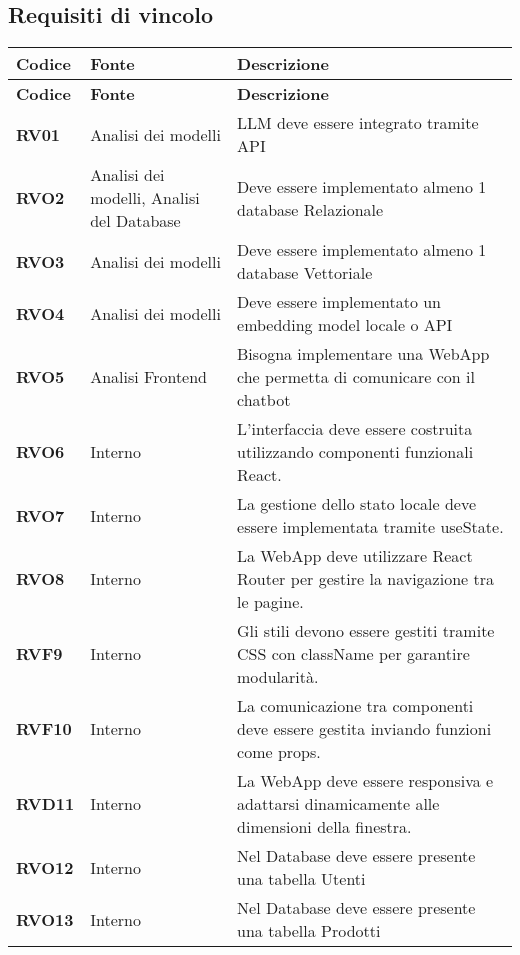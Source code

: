 \subsection{Requisiti di vincolo}
\begin{longtable}{|>{\centering\arraybackslash}m{}|>{\centering\arraybackslash}m{}|>{\centering\arraybackslash}m{}|}
	\hline
	\textbf{Codice} & \textbf{Fonte} & \textbf{Descrizione}\\\hline
	\endfirsthead
	\hline
	\textbf{Codice} & \textbf{Fonte} & \textbf{Descrizione}\\\hline
	\endhead
	\hline
	\textbf{RV01} & Analisi dei modelli    & LLM deve essere integrato tramite API\\
	\hline
	\textbf{RVO2} & Analisi dei modelli, Analisi del Database & Deve essere implementato almeno 1 database Relazionale\\
	\hline
	\textbf{RVO3} & Analisi dei modelli & Deve essere implementato almeno 1 database Vettoriale\\
	\hline
	\textbf{RVO4} & Analisi dei modelli & Deve essere implementato un embedding model locale o API\\
	\hline
	\textbf{RVO5} & Analisi Frontend & Bisogna implementare una WebApp che permetta di comunicare con il chatbot\\
	\hline
	\textbf{RVO6} & Interno & L’interfaccia deve essere costruita utilizzando componenti funzionali React.\\
	\hline
	\textbf{RVO7} & Interno & La gestione dello stato locale deve essere implementata tramite useState.\\
	\hline
	\textbf{RVO8} & Interno & La WebApp deve utilizzare React Router per gestire la navigazione tra le pagine.\\
	\hline
	\textbf{RVF9} & Interno & Gli stili devono essere gestiti tramite CSS con className per garantire modularità.\\
	\hline
	\textbf{RVF10} & Interno & La comunicazione tra componenti deve essere gestita inviando funzioni come props.\\
	\hline
	\textbf{RVD11} & Interno & La WebApp deve essere responsiva e adattarsi dinamicamente alle dimensioni della finestra.\\
	\hline
	\textbf{RVO12} & Interno & Nel Database deve essere presente una tabella Utenti \\
	\hline
	\textbf{RVO13} & Interno & Nel Database deve essere presente una tabella Prodotti\\

\end{longtable}
